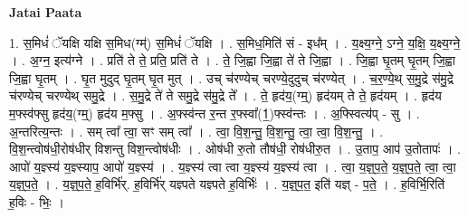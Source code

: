 \documentclass[17pt]{extarticle}
\begin{document}
\textbf{Jatai Paata} \newline

1. स॒मिधं॑ ॅयक्षि यक्षि स॒मिध(ग्म्॑) स॒मिधं॑ ॅयक्षि । . स॒मिध॒मिति॑ सं - इध᳚म् । . य॒क्ष्य॒ग्ने॒ ऽग्ने॒ य॒क्षि॒ य॒क्ष्य॒ग्ने॒ । . अ॒ग्न॒ इत्य॑ग्ने । . प्रति॑ ते ते॒ प्रति॒ प्रति॑ ते । . ते॒ जि॒ह्वा जि॒ह्वा ते॑ ते जि॒ह्वा । . जि॒ह्वा घृ॒तम् घृ॒तम् जि॒ह्वा जि॒ह्वा घृ॒तम् । . घृ॒त मुदुद् घृ॒तम् घृ॒त मुत् । . उच् च॑रण्येच् चरण्ये॒दुदुच् च॑रण्येत् । . च॒र॒ण्ये॒थ् स॒मु॒द्रे स॑मु॒द्रे च॑रण्येच् चरण्येथ् समु॒द्रे । . स॒मु॒द्रे ते॑ ते समु॒द्रे स॑मु॒द्रे ते᳚ । . ते॒ हृद॑य॒(ग्म्॒) हृद॑यम् ते ते॒ हृद॑यम् । . हृद॑य म॒फ्स्व॑फ्सु हृद॑य॒(ग्म्॒) हृद॑य म॒फ्सु । . अ॒फ्स्व॑न्त र॒न्त र॒फ्स्वा᳚(1॒)फ्स्व॑न्तः । . अ॒फ्स्वित्य॑प् - सु । . अ॒न्तरित्य॒न्तः । . सम् त्वा᳚ त्वा॒ सꣳ सम् त्वा᳚ । . त्वा॒ वि॒श॒न्तु॒ वि॒श॒न्तु॒ त्वा॒ त्वा॒ वि॒श॒न्तु॒ । . वि॒श॒न्त्वोष॑धी॒रोष॑धीर् विशन्तु विश॒न्त्वोष॑धीः । . ओष॑धी रु॒तो तौष॑धी॒ रोष॑धीरु॒त । . उ॒ताप॒ आप॑ उ॒तोतापः॑ । . आपो॑ य॒ज्ञ्स्य॑ य॒ज्ञ्स्याप॒ आपो॑ य॒ज्ञ्स्य॑ । . य॒ज्ञ्स्य॑ त्वा त्वा य॒ज्ञ्स्य॑ य॒ज्ञ्स्य॑ त्वा । . त्वा॒ य॒ज्ञ्॒प॒ते॒ य॒ज्ञ्॒प॒ते॒ त्वा॒ त्वा॒ य॒ज्ञ्॒प॒ते॒ । . य॒ज्ञ्॒प॒ते॒ ह॒विर्भि॑र्. ह॒विर्भि॑र् यज्ञ्पते यज्ञ्पते ह॒विर्भिः॑ । . य॒ज्ञ्॒प॒त॒ इति॑ यज्ञ् - प॒ते॒ । . ह॒विर्भि॒रिति॑ ह॒विः - भिः॒ । \newline
\end{document}
